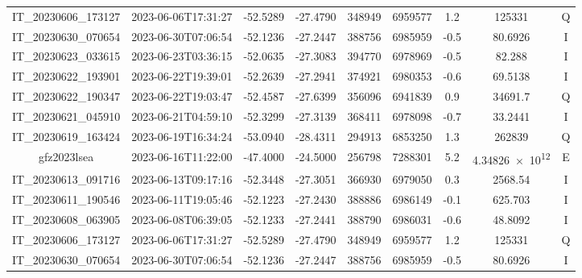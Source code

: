 \begin{center}
\begin{longtable}{ccccS[table-format=6.0]S[table-format=7.0]ccc}
\begin{adjustbox}{width=\textwidth}
    IT\_20230606\_173127 & 2023-06-06T17:31:27 & -52.5289 & -27.4790 & 348949 & 6959577 & 1.2 & \num[round-precision=3,round-mode=figures,scientific-notation=true]{125331} & Q \\               IT\_20230630\_070654 & 2023-06-30T07:06:54 & -52.1236 & -27.2447 & 388756 & 6985959 & -0.5 & \num[round-precision=3,round-mode=figures,scientific-notation=true]{80.6926} & I \\
    IT\_20230623\_033615 & 2023-06-23T03:36:15 & -52.0635 & -27.3083 & 394770 & 6978969 & -0.5 & \num[round-precision=3,round-mode=figures,scientific-notation=true]{82.288} & I \\
    IT\_20230622\_193901 & 2023-06-22T19:39:01 & -52.2639 & -27.2941 & 374921 & 6980353 & -0.6 & \num[round-precision=3,round-mode=figures,scientific-notation=true]{69.5138} & I \\
    IT\_20230622\_190347 & 2023-06-22T19:03:47 & -52.4587 & -27.6399 & 356096 & 6941839 & 0.9 & \num[round-precision=3,round-mode=figures,scientific-notation=true]{34691.7} & Q \\
    IT\_20230621\_045910 & 2023-06-21T04:59:10 & -52.3299 & -27.3139 & 368411 & 6978098 & -0.7 & \num[round-precision=3,round-mode=figures,scientific-notation=true]{33.2441} & I \\
    IT\_20230619\_163424 & 2023-06-19T16:34:24 & -53.0940 & -28.4311 & 294913 & 6853250 & 1.3 & \num[round-precision=3,round-mode=figures,scientific-notation=true]{262839} & Q \\
    gfz2023lsea & 2023-06-16T11:22:00 & -47.4000 & -24.5000 & 256798 & 7288301 & 5.2 & \num[round-precision=3,round-mode=figures,scientific-notation=true]{4.34826e+12} & E \\
    IT\_20230613\_091716 & 2023-06-13T09:17:16 & -52.3448 & -27.3051 & 366930 & 6979050 & 0.3 & \num[round-precision=3,round-mode=figures,scientific-notation=true]{2568.54} & I \\
    IT\_20230611\_190546 & 2023-06-11T19:05:46 & -52.1223 & -27.2430 & 388886 & 6986149 & -0.1 & \num[round-precision=3,round-mode=figures,scientific-notation=true]{625.703} & I \\
    IT\_20230608\_063905 & 2023-06-08T06:39:05 & -52.1233 & -27.2441 & 388790 & 6986031 & -0.6 & \num[round-precision=3,round-mode=figures,scientific-notation=true]{48.8092} & I \\
    IT\_20230606\_173127 & 2023-06-06T17:31:27 & -52.5289 & -27.4790 & 348949 & 6959577 & 1.2 & \num[round-precision=3,round-mode=figures,scientific-notation=true]{125331} & Q \\               IT\_20230630\_070654 & 2023-06-30T07:06:54 & -52.1236 & -27.2447 & 388756 & 6985959 & -0.5 & \num[round-precision=3,round-mode=figures,scientific-notation=true]{80.6926} & I \\

\end{adjustbox}
\end{longtable}
\end{center}

